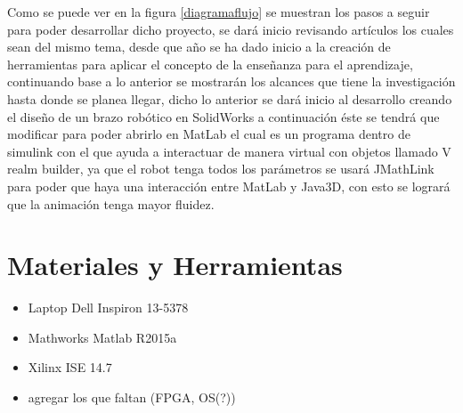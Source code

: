 \newpage
Como se puede ver en la figura \ref{diagramaflujo} se muestran los pasos a seguir para poder desarrollar dicho proyecto, se dará inicio revisando artículos los cuales sean del mismo tema, desde que año se ha dado inicio a la creación de herramientas para aplicar el concepto de la enseñanza para el aprendizaje, continuando base a lo anterior se mostrarán los alcances que tiene la investigación hasta donde se planea llegar, dicho lo anterior se dará inicio al desarrollo creando el diseño de un brazo robótico en SolidWorks a continuación éste se tendrá que modificar para poder abrirlo en MatLab el cual es un programa dentro de simulink con el que ayuda a interactuar de manera virtual con objetos llamado V realm builder, ya que el robot tenga todos los parámetros se usará JMathLink para poder que haya una interacción entre MatLab y Java3D, con esto se logrará que la animación tenga mayor fluidez.

\section{Materiales y Herramientas}
\begin{itemize}
\item Laptop Dell Inspiron 13-5378
\item Mathworks Matlab R2015a
\item Xilinx ISE 14.7
\color{red}
\item agregar los que faltan (FPGA, OS(?))
\end{itemize}
